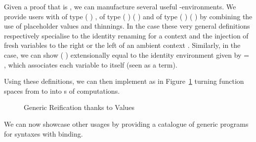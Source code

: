 \label{sec:varlike:base}
Given a proof that  is , we can manufacture
several useful -environments. We provide users with
 of type {( )  },
 of type
{( )  ( \AF{++} )}
and  of type
{( )  ( \AF{++} )}
by combining the use of placeholder values and thinnings.
%
In the  case these very general definitions respectively specialise
to the identity renaming for a context  and the injection of 
fresh variables to the right or the left of an ambient context .
%
Similarly, in the  case, we can show
{( )}
extensionally equal to the identity environment 
given by {  = },
which associates each variable to itself (seen as a term).

Using these definitions, we can then implement  as in
Figure~\ref{fig:kripkereify} turning  function spaces
from  to  into s of  computations.

\begin{figure}[h]
\caption{Generic Reification thanks to  Values%
\label{fig:kripkereify}}
\end{figure}

We can now showcase other usages by providing a catalogue of generic programs
for syntaxes with binding.



